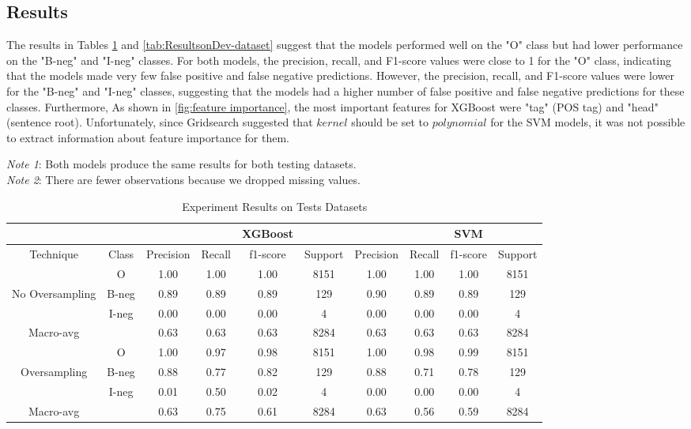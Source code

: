 
\subsection*{Results}
The results in Tables \ref{results} and \ref{tab:ResultsonDev-dataset} suggest that the models performed well on the "O" class but had lower performance on the "B-neg" and "I-neg" classes. For both models, the precision, recall, and F1-score values were close to 1 for the "O" class, indicating that the models made very few false positive and false negative predictions. However, the precision, recall, and F1-score values were lower for the "B-neg" and "I-neg" classes, suggesting that the models had a higher number of false positive and false negative predictions for these classes. Furthermore, As shown in \ref{fig:feature importance}, the most important features for XGBoost were "tag" (POS tag) and "head" (sentence root). Unfortunately, since Gridsearch suggested that $kernel$ should be set to $polynomial$ for the SVM models, it was not possible to extract information about feature importance for them.  

 
\begin{table}[!h]
{\fontsize{9}{4}
\textit{Note 1}: Both models produce the same results for both testing datasets.
\\
\textit{Note 2}: There are fewer observations because we dropped missing values.}
\centering
\begin{tabular}{cc|cccc|cccc}
\hline
 &  &  &  & XGBoost &  &  &  & SVM &  \\ \hline
Technique & Class & Precision & Recall & f1-score & Support & Precision & Recall & f1-score & Support \\ \hline
 & O & 1.00 & 1.00 & 1.00 & 8151 & 1.00 & 1.00 & 1.00 & 8151 \\
No Oversampling & B-neg & 0.89 & 0.89 & 0.89 & 129 & 0.90 & 0.89 & 0.89 & 129 \\
 & I-neg & 0.00 & 0.00 & 0.00 & 4 & 0.00 & 0.00 & 0.00 & 4 \\
Macro-avg &  & 0.63 & 0.63 & 0.63 & 8284 & 0.63 & 0.63 & 0.63 & 8284 \\ \hline
 & O & 1.00 & 0.97 & 0.98 & 8151 & 1.00 & 0.98 & 0.99 & 8151 \\
Oversampling & B-neg & 0.88 & 0.77 & 0.82 & 129 & 0.88 & 0.71 & 0.78 & 129 \\
 & I-neg & 0.01 & 0.50 & 0.02 & 4 & 0.00 & 0.00 & 0.00 & 4 \\
Macro-avg &  & 0.63 & 0.75 & 0.61 & 8284 & 0.63 & 0.56 & 0.59 & 8284 \\ \hline
\end{tabular}

\smallskip
\caption{Experiment Results on Tests Datasets}
\label{results}
\end{table}
 
